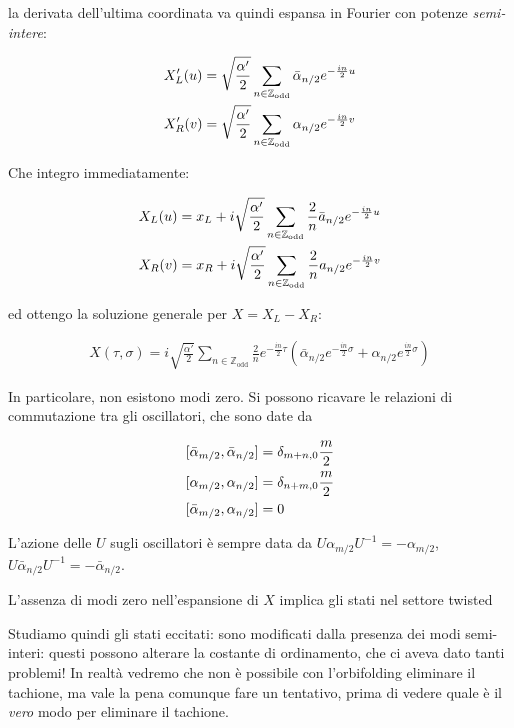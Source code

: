 \documentclass{report}
\begin{document}
la derivata dell'ultima coordinata va quindi espansa in Fourier con potenze \emph{semi-intere}: 

\begin{align}
    &X'_L (u) = \sqrt{\frac{\alpha'}{2}}\sum_{n\in \mathbb{Z}_{\text{odd}}}\bar{\alpha}_{n/2}e^{-\frac{in}{2}u} \notag \\
    &X'_R (v) = \sqrt{\frac{\alpha'}{2}}\sum_{n\in \mathbb{Z}_{\text{odd}}}\alpha_{n/2}e^{-\frac{in}{2}v}
\end{align}

Che integro immediatamente: 

\begin{align}
    &X_L(u) = x_L + i\sqrt{\frac{\alpha'}{2}}\sum_{n \in \mathbb{Z}_{\text{odd}}}\frac{2}{n}\bar{a}_{n/2}e^{-\frac{in}{2}u} \notag \\
    &X_R(v) = x_R + i\sqrt{\frac{\alpha'}{2}}\sum_{n \in \mathbb{Z}_{\text{odd}}}\frac{2}{n}a_{n/2}e^{-\frac{in}{2}v} 
\end{align}

ed ottengo la soluzione generale per \(X = X_L - X_R\): 

\begin{align}
    X(\tau, \sigma) = i\sqrt{\frac{\alpha'}{2}}\sum_{n \in \mathbb{Z}_{\text{odd}}}\frac{2}{n}e^{-\frac{in}{2}\tau}\left(\bar{\alpha}_{n/2}e^{-\frac{in}{2}\sigma} + \alpha_{n/2}e^{\frac{in}{2}\sigma} \right)
\end{align}

In particolare, non esistono modi zero. Si possono ricavare le relazioni di commutazione tra gli oscillatori, che sono date da 

\begin{align}
    &[\bar{\alpha}_{m/2}, \bar{\alpha}_{n/2}] = \delta_{m+n, 0}\frac{m}{2} \notag \\ 
    &[\alpha_{m/2}, \alpha_{n/2}] = \delta_{n+m, 0}\frac{m}{2} \notag \\ 
    &[\bar{\alpha}_{m/2}, \alpha_{n/2}] = 0 
\end{align}

L'azione delle \(U\) sugli oscillatori è sempre data da \(U\alpha_{m/2}U^{-1} = -\alpha_{m/2}\), \(U\bar{\alpha}_{n/2}U^{-1} = -\bar{\alpha}_{n/2}\). 

L'assenza di modi zero nell'espansione di \(X\) implica gli stati nel settore twisted 

Studiamo quindi gli stati eccitati: sono modificati dalla presenza dei modi semi-interi: questi possono alterare la costante di ordinamento, che ci aveva dato tanti problemi! In realtà vedremo che non è possibile con l'orbifolding eliminare il tachione, ma vale la pena comunque fare un tentativo, prima di vedere quale è il \emph{vero} modo per eliminare il tachione. 
\end{document}
